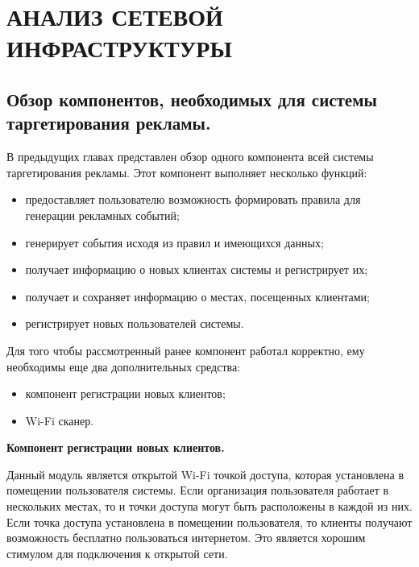 \chapter{АНАЛИЗ СЕТЕВОЙ ИНФРАСТРУКТУРЫ}

\section{Обзор компонентов, необходимых для системы таргетирования рекламы.}

В предыдущих главах представлен обзор одного компонента всей системы таргетирования рекламы. Этот компонент выполняет несколько функций:

\begin{itemize}
	\item предоставляет пользователю возможность формировать правила для генерации рекламных событий;
	\item генерирует события исходя из правил и имеющихся данных;
	\item получает информацию о новых клиентах системы и регистрирует их;
	\item получает и сохраняет информацию о местах, посещенных клиентами;
	\item регистрирует новых пользователей системы.
\end{itemize}

Для того чтобы рассмотренный ранее компонент работал корректно, ему необходимы еще два дополнительных средства:

\begin{itemize}
	\item компонент регистрации новых клиентов;
	\item Wi-Fi сканер.
\end{itemize}

\textbf{Компонент регистрации новых клиентов.}

Данный модуль является открытой Wi-Fi точкой доступа, которая установлена в помещении пользователя системы. Если организация пользователя работает в нескольких местах, то и точки доступа могут быть расположены в каждой из них. Если точка доступа установлена в помещении пользователя, то клиенты получают возможность бесплатно пользоваться интернетом. Это является хорошим стимулом для подключения к открытой сети. 

